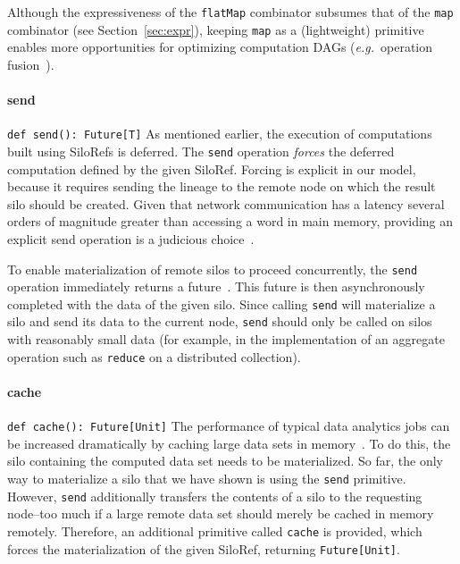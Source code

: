 \documentclass{jfp1}
\newcommand\eg{\emph{e.g.}\ }
\begin{document}
Although the expressiveness of the \verb|flatMap| combinator subsumes that of
the \verb|map| combinator (see Section~\ref{sec:expr}), keeping \verb|map| as a
(lightweight) primitive enables more opportunities for optimizing computation
DAGs (\eg operation fusion~\cite{FlumeJava}).

\paragraph{send}%
%
\texttt{def send(): Future[T]} \newline
%
As mentioned earlier, the execution of computations built using SiloRefs is
deferred. The \verb|send| operation {\em forces} the deferred computation defined
by the given SiloRef.  Forcing is explicit in our model, because it requires
sending the lineage to the remote node on which the result silo should be
created. Given that network communication has a latency several orders of
magnitude greater than accessing a word in main memory, providing an explicit
send operation is a judicious choice~\cite{ANoteDistComp}.

To enable materialization of remote silos to proceed concurrently, the
\verb|send| operation immediately returns a future~\cite{Futures}. This future
is then asynchronously completed with the data of the given silo. Since calling
\verb|send| will materialize a silo and send its data to the current node,
\verb|send| should only be called on silos with reasonably small data (for
example, in the implementation of an aggregate operation such as \verb|reduce|
on a distributed collection).

\paragraph{cache}%
%
\texttt{def cache(): Future[Unit]} \newline
%
The performance of typical data analytics jobs can be increased dramatically by
caching large data sets in memory~\cite{Spark}. To do this, the silo containing
the computed data set needs to be materialized. So far, the only way to
materialize a silo that we have shown is using the \verb|send| primitive.
However, \verb|send| additionally transfers the contents of a silo to the
requesting node--too much if a large remote data set should merely be cached in
memory remotely.  Therefore, an additional primitive called \verb|cache| is
provided, which forces the materialization of the given SiloRef, returning
\verb|Future[Unit]|.
\end{document}
